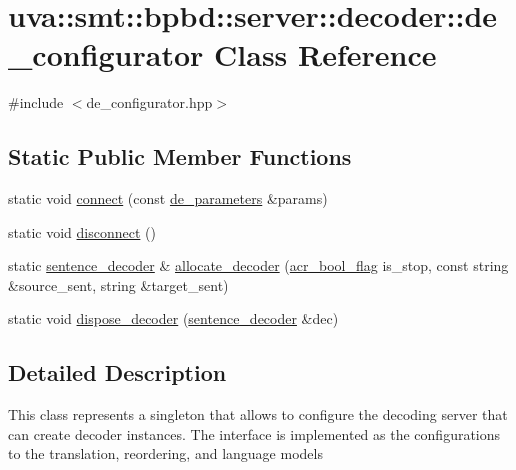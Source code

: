 \hypertarget{classuva_1_1smt_1_1bpbd_1_1server_1_1decoder_1_1de__configurator}{}\section{uva\+:\+:smt\+:\+:bpbd\+:\+:server\+:\+:decoder\+:\+:de\+\_\+configurator Class Reference}
\label{classuva_1_1smt_1_1bpbd_1_1server_1_1decoder_1_1de__configurator}


{\ttfamily \#include $<$de\+\_\+configurator.\+hpp$>$}

\subsection*{Static Public Member Functions}
\begin{DoxyCompactItemize}
\item 
static void \hyperlink{classuva_1_1smt_1_1bpbd_1_1server_1_1decoder_1_1de__configurator_ad63482752d6be89b3a56d4fa57e0a7c0}{connect} (const \hyperlink{namespaceuva_1_1smt_1_1bpbd_1_1server_1_1decoder_aaf4d5faf3a48156401c854d163d4b848}{de\+\_\+parameters} \&params)
\item 
static void \hyperlink{classuva_1_1smt_1_1bpbd_1_1server_1_1decoder_1_1de__configurator_a6857ee035e566469fdafc3bd6fb2a92b}{disconnect} ()
\item 
static \hyperlink{classuva_1_1smt_1_1bpbd_1_1server_1_1decoder_1_1sentence_1_1sentence__decoder}{sentence\+\_\+decoder} \& \hyperlink{classuva_1_1smt_1_1bpbd_1_1server_1_1decoder_1_1de__configurator_aadf303dc8fbc43df002f0d8bdb97facb}{allocate\+\_\+decoder} (\hyperlink{namespaceuva_1_1utils_1_1threads_a1c174d3a90b2b056554d897188ad2c74}{acr\+\_\+bool\+\_\+flag} is\+\_\+stop, const string \&source\+\_\+sent, string \&target\+\_\+sent)
\item 
static void \hyperlink{classuva_1_1smt_1_1bpbd_1_1server_1_1decoder_1_1de__configurator_a0518550eb8a56127225376ccb996d3f2}{dispose\+\_\+decoder} (\hyperlink{classuva_1_1smt_1_1bpbd_1_1server_1_1decoder_1_1sentence_1_1sentence__decoder}{sentence\+\_\+decoder} \&dec)
\end{DoxyCompactItemize}


\subsection{Detailed Description}
This class represents a singleton that allows to configure the decoding server that can create decoder instances. The interface is implemented as the configurations to the translation, reordering, and language models 

